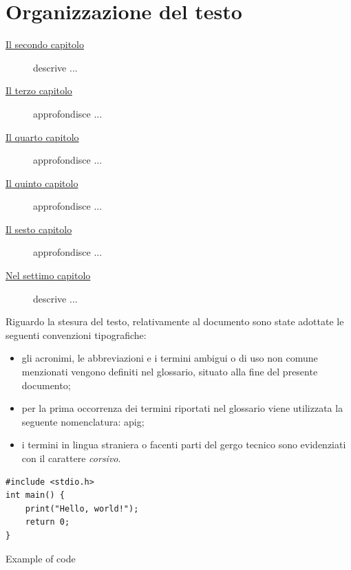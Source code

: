 \section{Organizzazione del testo}
\begin{description}
    \item[{\hyperref[chap:processi-metodologie]{Il secondo capitolo}}] descrive ...
    
    \item[{\hyperref[chap:descrizione-stage]{Il terzo capitolo}}] approfondisce ...
    
    \item[{\hyperref[chap:analisi-requisiti]{Il quarto capitolo}}] approfondisce ...
    
    \item[{\hyperref[chap:progettazione-codifica]{Il quinto capitolo}}] approfondisce ...
    
    \item[{\hyperref[chap:verifica-validazione]{Il sesto capitolo}}] approfondisce ...
    
    \item[{\hyperref[chap:conclusioni]{Nel settimo capitolo}}] descrive ...
\end{description}

Riguardo la stesura del testo, relativamente al documento sono state adottate le seguenti convenzioni tipografiche:
\begin{itemize}
	\item gli acronimi, le abbreviazioni e i termini ambigui o di uso non comune menzionati vengono definiti nel glossario, situato alla fine del presente documento;
	\item per la prima occorrenza dei termini riportati nel glossario viene utilizzata la seguente nomenclatura: \gls{apig};
	\item i termini in lingua straniera o facenti parti del gergo tecnico sono evidenziati con il carattere \textit{corsivo}.
\end{itemize}

\begin{listing}[H]
\begin{verbatim}
#include <stdio.h>
int main() {
    print("Hello, world!");
    return 0;
}
\end{verbatim}
\caption{Example of code}
\label{listing:a}
\end{listing}

\newpage